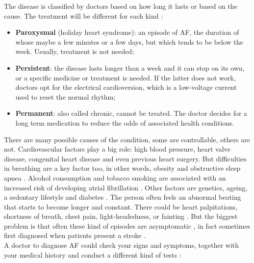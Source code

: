 The disease is classified by doctors based on how long it lasts or based on the cause. The treatment will be different for each kind \cite{webmd2018}:
\begin{itemize}
  \item \textbf{Paroxysmal} (holiday heart syndrome): an episode of AF, the duration of whose maybe a few minutes or a few days, but which tends to be below the week. Usually, treatment is not needed;
  \item \textbf{Persistent}: the disease lasts longer than a week and it can stop on its own, or a specific medicine or treatment is needed. If the latter does not work, doctors opt for the electrical cardioversion, which is a low-voltage current used to reset the normal rhythm;
  \item \textbf{Permanent}: also called chronic, cannot be treated. The doctor decides for a long term medication to reduce the odds of associated health conditions.
\end{itemize}
There are many possible causes of the condition, some are controllable, others are not. Cardiovascular factors play a big role: high blood pressure, heart valve disease, congenital heart disease and even previous heart surgery. But difficulties in breathing are a key factor too, in other words, obesity and obstructive sleep apnea \cite{doi:10.1111/obr.12056}. Alcohol consumption and tobacco smoking are associated with an increased risk of developing atrial fibrillation \cite{Tonelo2013, DU20171968}. Other factors are genetics, ageing, a sedentary lifestyle and diabetes \cite{10.1001/jama.291.23.2851, Staerk2017}.
The person often feels an abnormal beating that starts to become longer and constant. There could be heart palpitations, shortness of breath, chest pain,  light-headedness, or fainting \cite{chamberlain_gray_houghton_2010}. But the biggest problem is that often these kind of episodes are asymptomatic \cite{Munger2014}, in fact sometimes first diagnosed when patients present a stroke \cite{page2003asymptomatic}.
\\
A doctor to diagnose AF could check your signs and symptoms, together with your medical history and conduct a different kind of tests \cite{mayo_clinic_2019}:
